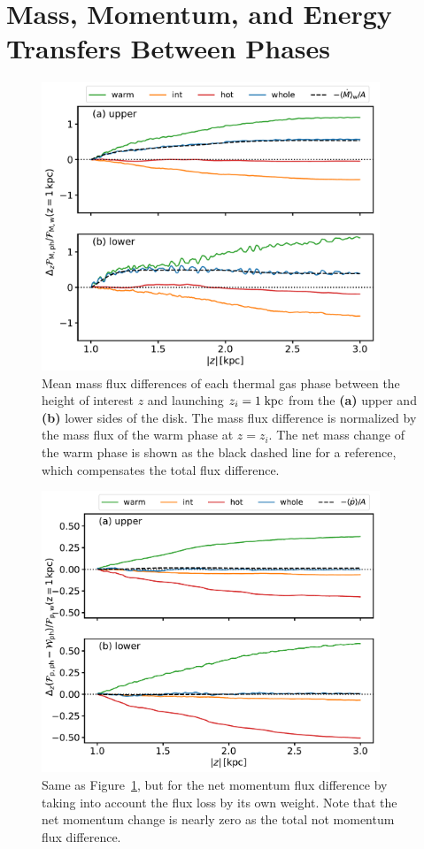 \documentclass[twocolumn]{aastex62}
\newcommand\kpc{\;{\rm kpc}}
\begin{document}
\section{Mass, Momentum, and Energy Transfers Between Phases}\label{sec:flux_analysis}
\begin{figure}
	\centering
	\includegraphics[width=0.9\textwidth]{mass_conservation.pdf}
	\caption{Mean mass flux differences of each thermal gas phase between the height of interest $z$ and launching $z_i=1\kpc$ from the {\bf (a)} upper and {\bf (b)} lower sides of the disk. The mass flux difference is normalized by the mass flux of the warm phase at $z=z_i$. The net mass change of the warm phase is shown as the black dashed line for a reference, which compensates the total flux difference.}
	\label{fig:mcons}
\end{figure}
\begin{figure}
	\centering
	\includegraphics[width=0.9\textwidth]{momentum_conservation.pdf}
	\caption{Same as Figure~\ref{fig:mcons}, but for the net momentum flux difference by taking into account the flux loss by its own weight. Note that the net momentum change is nearly zero as the total not momentum flux difference.}
	\label{fig:pcons}
\end{figure}
\end{document}
